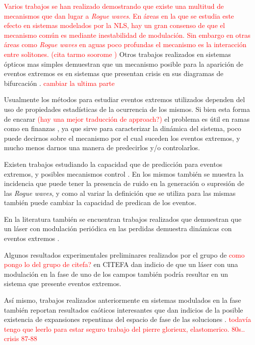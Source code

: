 		\textcolor{red}{ Varios trabajos se han realizado demostrando que existe una multitud de mecanismos que dan lugar a \textit{Rogue waves}.
		En áreas en la que se estudia este efecto en sistemas modelados por la NLS, hay un gran consenso de que el mecanismo común es mediante inestabilidad de modulación. 
		Sin embargo en otras áreas como \textit{Rogue waves} en aguas poco profundas el mecanismo es la interacción entre solitones. (cita tarmo soorome \cite{Ruban2010} ) }
		Otros trabajos realizados en sistemas ópticos mas simples demuestran que un mecanismo posible para la aparición de eventos extremos es en sistemas que presentan crisis en sus diagramas de bifurcación \cite{Metayer:14}\cite{PhysRevA.87.035802} .
		\textcolor{red}{cambiar la ultima parte}
		
		
		Usualmente los métodos para estudiar eventos extremos utilizados dependen del uso de propiedades estadísticas de la ocurrencia de los mismos.
		Si bien esta forma de encarar \textcolor{red}{(hay una mejor traducción de approach?)} el problema es útil en ramas como en finanzas \cite{Gilli2006_finanza}, ya que sirve para caracterizar la dinámica del sistema, poco puede decirnos sobre el mecanismo por el cual suceden los eventos extremos, y mucho menos darnos una manera de predecirlos y/o controlarlos.
		
		Existen trabajos estudiando la capacidad que de predicción para eventos extremos, y posibles mecanismos control 		\cite{Ahuja:14} .
		En los mismos también se muestra la incidencia que puede tener la presencia de ruido en la generación o supresión de las \textit{Rogue waves}, y como al variar la definición que se utiliza para las mismas también puede cambiar la capacidad de predican de los eventos.
		
		En la literatura también se encuentran trabajos realizados que demuestran que un láser con modulación periódica en las perdidas demuestra dinámicas con eventos extremos \cite{Metayer:14} .
		
		Algunos resultados experimentales preliminares realizados por el grupo de \textcolor{red}{como pongo lo del grupo de citefa?} en CITEFA dan indicio de que un láser con una modulación en la fase de uno de los campos también podría resultar en un sistema que presente eventos extremos.
		
		Así mismo, trabajos realizados anteriormente en sistemas modulados en la fase también reportan resultados caóticos interesantes que dan indicios de la posible existencia de expansiones repentinas del espacio de fase de las soluciones \cite{PhysRevLett.55.1989}. \textcolor{red}{todavía tengo que leerlo para estar seguro}
		\textcolor{red}{trabajo del pierre glorieux, elastomerico. 80s.. crisis 87-88 \cite{PhysRevLett.55.1989}  }
		
